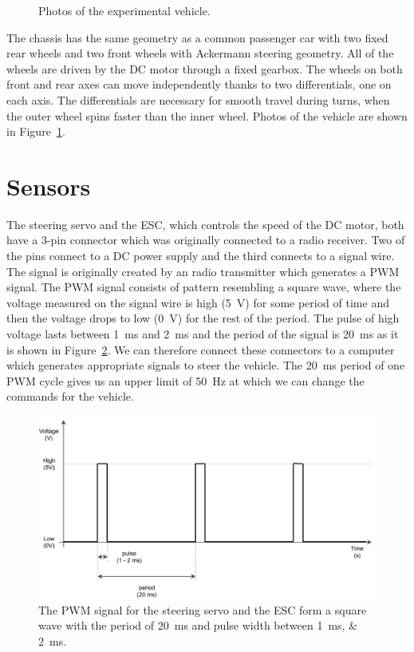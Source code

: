 \begin{figure}[!tbp]
	\label{fig:chassis}
	\caption{Photos of the experimental vehicle.}
\end{figure}

The chassis has the same geometry as a common passenger car with two fixed rear wheels and two front wheels with Ackermann steering geometry. All of the wheels are driven by the \gls*{DC} motor through a fixed gearbox. The wheels on both front and rear axes can move independently thanks to two differentials, one on each axis. The differentials are necessary for smooth travel during turns, when the outer wheel spins faster than the inner wheel. Photos of the vehicle are shown in Figure~\ref{fig:chassis}.

\section{Sensors}

The steering servo and the \gls*{ESC}, which controls the speed of the \gls*{DC} motor, both have a 3-pin connector which was originally connected to a radio receiver. Two of the pins connect to a \gls*{DC} power supply and the third connects to a signal wire. The signal is originally created by an radio transmitter which generates a \gls{PWM} signal. The \gls*{PWM} signal consists of pattern resembling a square wave, where the voltage measured on the signal wire is high (\SI{5}{\volt}) for some period of time and then the voltage drops to low (\SI{0}{\volt}) for the rest of the period. The pulse of high voltage lasts between \SI{1}{\milli\second} and \SI{2}{\milli\second} and the period of the signal is \SI{20}{\milli\second} as it is shown in Figure~\ref{fig:pwm}. We can therefore connect these connectors to a computer which generates appropriate signals to steer the vehicle. The \SI{20}{\milli\second} period of one \gls*{PWM} cycle gives us an upper limit of \SI{50}{\hertz} at which we can change the commands for the vehicle.


\begin{figure}[]\centering
	\includegraphics[width=125mm]{../img/pwm.pdf}
	\caption{The PWM signal for the steering servo and the ESC form a square wave with the period of \SI{20}{\milli\second} and pulse width between \SIlist{1;2}{\milli\second}.}
	\label{fig:pwm}
\end{figure}
